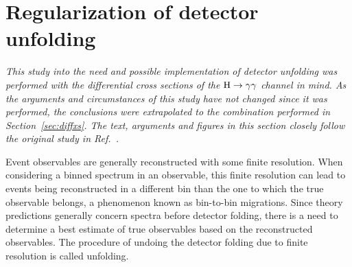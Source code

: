 \section{Regularization of detector unfolding}
\label{sec:regularization}

\emph{%
This study into the need and possible implementation of detector unfolding was performed with the differential cross sections of the $\mathrm{H}\to\mathrm{\gamma}\mathrm{\gamma}$ channel in mind.
% 
As the arguments and circumstances of this study have not changed since it was performed, the conclusions were extrapolated to the combination performed in Section~\ref{sec:diffxs}.
% 
The text, arguments and figures in this section closely follow the original study in Ref.~\cite{AN-17-041}.
}

Event observables are generally reconstructed with some finite resolution.
% 
When considering a binned spectrum in an observable, this finite resolution can lead to events being reconstructed in a different bin than the one to which the true observable belongs, a phenomenon known as bin-to-bin migrations.
% 
Since theory predictions generally concern spectra before detector folding, there is a need to determine a best estimate of true observables based on the reconstructed observables.
% 
The procedure of undoing the detector folding due to finite resolution is called unfolding.


